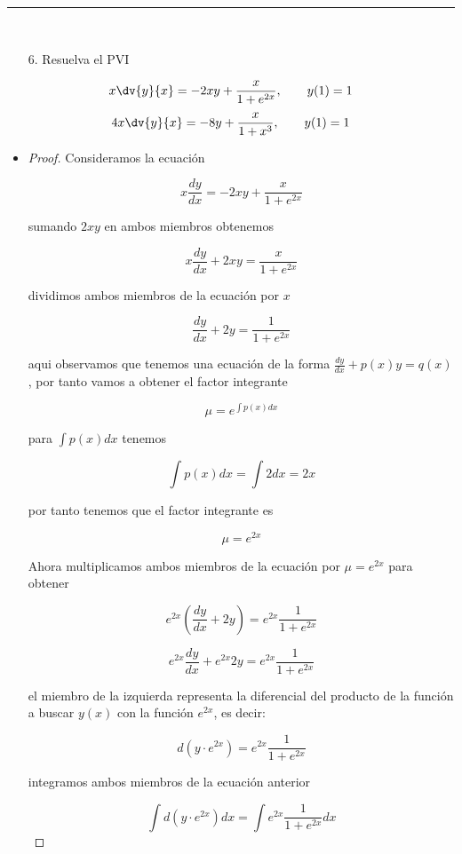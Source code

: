 \rule[2ex]{\textwidth}{2pt}\\


\begin{enumerate}
    \item[6.] Resuelva el PVI
\end{enumerate}
\begin{align*}
    x\dv{y}{x} = -2xy+ \frac{x}{1+e^{2x}}, \qquad y(1)= 1
\end{align*}
\begin{align*}
    4x \dv{y}{x} = -8y + \frac{x}{1+x^{3}}, \qquad y(1)=1
\end{align*}

\begin{itemize}
    \item \begin{proof}
Consideramos la ecuación

$$x\frac{dy}{dx}=-2xy+\frac{x}{1+e^{2x}}$$

sumando $2xy$ en ambos miembros obtenemos

$$x\frac{dy}{dx}+2xy=\frac{x}{1+e^{2x}}$$

dividimos ambos miembros de la ecuación por $x$

$$\frac{dy}{dx}+2y=\frac{1}{1+e^{2x}}$$

aqui observamos que tenemos una ecuación de la forma $\frac{dy}{dx}+p(x)y=q(x)$, por tanto vamos a obtener el factor integrante 

$$\mu=e^{{\int} p(x)dx}$$

para $\int p(x)dx$ tenemos

$$\int p(x)dx=\int 2 dx=2x$$

por tanto tenemos que el factor integrante es

$$\mu=e^{2x}$$

Ahora multiplicamos ambos miembros de la ecuación por $\mu=e^{2x}$ para obtener

$$e^{2x}(\frac{dy}{dx}+2y)=e^{2x}\frac{1}{1+e^{2x}} $$

$$e^{2x}\frac{dy}{dx}+e^{2x}2y=e^{2x}\frac{1}{1+e^{2x}} $$

el miembro de la izquierda representa la diferencial del producto de la función a buscar $y(x)$ con la función $e^{2x}$, es decir:

$$d(y\cdot e^{2x})=e^{2x}\frac{1}{1+e^{2x}}$$

integramos ambos miembros de la ecuación anterior 

$$\int d(y\cdot e^{2x})dx=\int e^{2x}\frac{1}{1+e^{2x}}dx$$


\end{proof}
\end{itemize}
